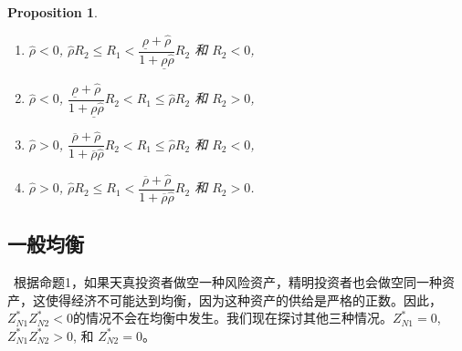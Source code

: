 \documentclass[10.0pt]{article}
\newtheorem{prop}{Proposition}
\begin{document}
\begin{prop}
\begin{enumerate}
\item [(1).] $ \hat{\rho} < 0 $, $ \hat{\rho} R_2 \leqslant R_1 < \dfrac{\underline{\rho} + {\hat \rho}}{1 + \underline{\rho} {\hat \rho}} R_2 $ 和 $ R_2 < 0 $,
\item [(2).] $ \hat{\rho} < 0 $, $ \dfrac{\underline{\rho} + {\hat \rho}}{1 + \underline{\rho} {\hat \rho}} R_2 < R_1 \leqslant \hat{\rho} R_2 $ 和 $ R_2 > 0 $, 
\item [(3).] $ \hat{\rho} > 0 $, $ \dfrac{\overline{\rho} + {\hat \rho}}{1 + \overline{\rho} {\hat \rho}} R_2 < R_1 \leqslant \hat{\rho} R_2 $ 和 $ R_2 < 0 $,
\item [(4).] $ \hat{\rho} > 0 $, $ \hat{\rho} R_2 \leqslant R_1 < \dfrac{\overline{\rho} + {\hat \rho}}{1 + \overline{\rho} {\hat \rho}} R_2 $ 和 $ R_2 > 0 $.
\end{enumerate}
\end{prop}

\subsection{一般均衡}

\quad \ 
根据命题1，如果天真投资者做空一种风险资产，精明投资者也会做空同一种资产，这使得经济不可能达到均衡，因为这种资产的供给是严格的正数。因此，$ Z_{N 1}^* Z_{N 2}^* < 0 $的情况不会在均衡中发生。我们现在探讨其他三种情况。$ Z_{N 1}^* = 0 $, $ Z_{N 1}^* Z_{N 2}^* > 0 $, 和 $ Z_{N 2}^* = 0 $。
\end{document}
